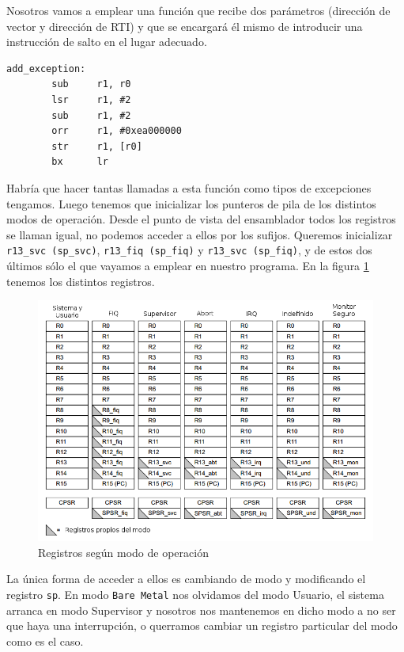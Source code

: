 Nosotros vamos a emplear una función que recibe dos parámetros (dirección de vector y dirección de
RTI) y que se encargará él mismo de introducir una instrucción de salto en el lugar adecuado.

\begin{lstlisting}
add_exception:
        sub     r1, r0
        lsr     r1, #2
        sub     r1, #2
        orr     r1, #0xea000000
        str     r1, [r0]
        bx      lr
\end{lstlisting}

Habría que hacer tantas llamadas a esta función como tipos de excepciones tengamos. Luego tenemos
que inicializar los punteros de pila de los distintos modos de operación. Desde el punto de vista
del ensamblador todos los registros se llaman igual, no podemos acceder a ellos por los sufijos.
Queremos inicializar {\tt r13\_svc (sp\_svc)}, {\tt r13\_fiq (sp\_fiq)} y {\tt r13\_svc (sp\_fiq)}, y
de estos dos últimos sólo el que vayamos a emplear en nuestro programa. En la figura 
\ref{fig:tablareg} tenemos los distintos registros.

\begin{figure}[h]
  \centering
    \includegraphics[width=14cm]{graphs/tablaregistros.png}
  \caption{Registros según modo de operación}
  \label{fig:tablareg}
\end{figure}

La única forma de acceder a ellos es cambiando de modo y modificando el registro {\tt sp}. En
modo {\tt Bare Metal} nos olvidamos del modo Usuario, el sistema arranca en modo Supervisor y
nosotros nos mantenemos en dicho modo a no ser que haya una interrupción, o querramos cambiar
un registro particular del modo como es el caso.

